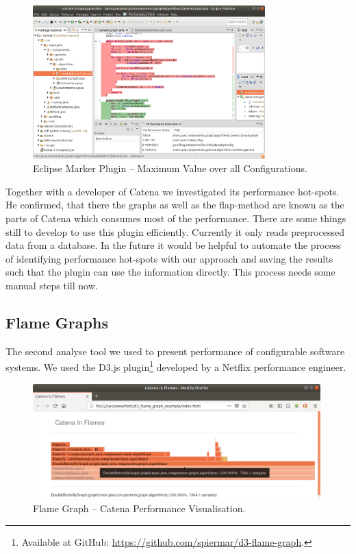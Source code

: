 \begin{figure}[h]
  \centering
  \includegraphics[width=0.8\textwidth]{images/eclipse1}
  \caption{Eclipse Marker Plugin -- Maximum Value over all Configurations.}
  \label{plugin_1}
\end{figure}


Together with a developer of Catena we investigated its performance hot-spots. He confirmed, that there the graphs as well as the flap-method are known as the parts of Catena which consumes most of the performance. 
There are some things still to develop to use this plugin efficiently. Currently it only reads preprocessed data from a database. In the future it would be helpful to automate the process of identifying performance hot-spots with our approach and saving the results such that the plugin can use the information directly. This process needs some manual steps till now.



\subsection{Flame Graphs}
\label{flame_graph}

The second analyse tool we used to present performance of configurable software systems. We used the D3.js plugin\footnote{Available at GitHub: \url{https://github.com/spiermar/d3-flame-graph}.} developed by a Netflix performance engineer. 

\begin{figure}[h]
  \centering
  \includegraphics[width=0.99\textwidth]{images/flame_1}
  \caption{Flame Graph -- Catena Performance Visualisation.}
  \label{flame_1}
\end{figure}

